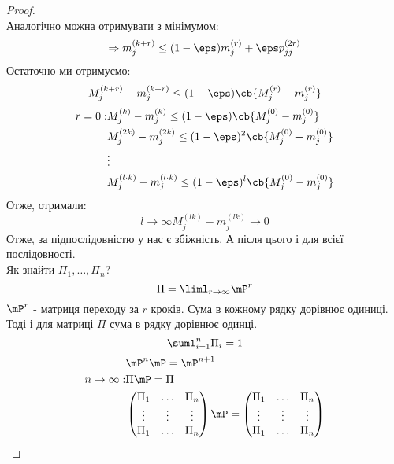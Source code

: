 \begin{proof}
\begin{equation}
\end{equation}
Аналогічно можна отримувати з мінімумом:
\begin{equation}
\Rightarrow m_j^{(k+r)} \leq (1-\eps) m_j^{(r)} +\eps p_{jj}^{(2r)}
\end{equation}
Остаточно ми отримуємо:
\begin{equation}
M_j^{(k+r)} - m_j^{(k+r)} \leq (1-\eps)\cb{M_j^{(r)}-m_j^{(r)}}
\end{equation}
\begin{eqnarray}
r=0:& M_j^{(k)} - m_j^{(k)} \leq (1-\eps)\cb{M_j^{(0)}-m_j^{(0)}}\\
&M_j^{(2k)} - m_j^{(2k)} \leq (1-\eps)^2\cb{M_j^{(0)}-m_j^{(0)}}\\
&\vdots\nonumber\\
&M_j^{(l\cdot k)} - m_j^{(l\cdot k)} \leq (1-\eps)^l\cb{M_j^{(0)}-m_j^{(0)}}\\
\end{eqnarray}
Отже, отримали:
\begin{equation}
l\to\infty M_j^{(lk)} - m_j^{(lk)} \to 0
\end{equation}
Отже, за підпослідовністю у нас є збіжність. А після цього і для всієї послідовності.\\
Як знайти $\Pi_1,\ldots,\Pi_n$?\\
\begin{equation}
\Pi = \liml_{r\to\infty} \mP^{r}
\end{equation}
$\mP^r$ - матриця переходу за $r$ кроків. Сума в кожному рядку дорівнює одиниці. \\
Тоді і для матриці $\Pi$ сума в рядку дорівнює одинці.\\
\begin{equation}
\suml_{i=1}^n \Pi_i = 1
\end{equation}
\begin{eqnarray}
&\mP^n\mP = \mP^{n+1}\\
n\to\infty:&\Pi\mP = \Pi\\
&\begin{pmatrix}
\Pi_1 & \ldots & \Pi_n \\
\vdots & \vdots & \vdots \\
\Pi_1 & \ldots &\Pi_n
\end{pmatrix} \mP = \begin{pmatrix}
\Pi_1 & \ldots & \Pi_n \\
\vdots & \vdots & \vdots \\
\Pi_1 & \ldots &\Pi_n
\end{pmatrix} \\

\end{eqnarray}
\end{proof}
